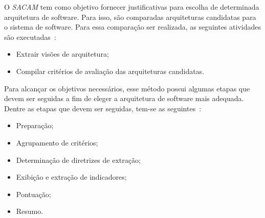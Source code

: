 O \emph{\acrfull{SACAM}} tem como objetivo fornecer justificativas para escolha de determinada arquitetura de software. Para isso, são comparadas arquiteturas candidatas para o sistema de software. Para essa comparação ser realizada, as seguintes atividades são executadas~\cite{SACAM}:

\begin{itemize}
    \item Extrair visões de arquitetura;
    \item Compilar critérios de avaliação das arquiteturas candidatas.
\end{itemize}

Para alcançar os objetivos necessários, esse  método possui algumas etapas que devem ser seguidas a fim de eleger a  arquitetura de software mais adequada. Dentre as etapas que devem ser seguidas, tem-se as seguintes~\cite{SACAM}:

\begin{itemize}
    \item Preparação;
    \item Agrupamento de critérios;
    \item Determinação de diretrizes de extração;
    \item Exibição e extração de indicadores;
    \item Pontuação;
    \item Resumo.
\end{itemize}

